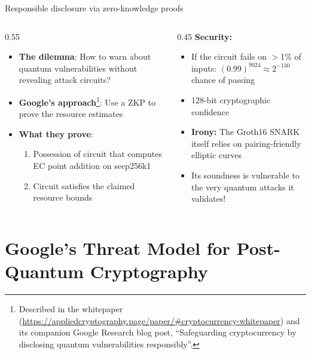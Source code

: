 \ifdefined\PRESENTATION\else\PassOptionsToClass{handout}{beamer}\fi\documentclass[aspectratio=169, lualatex]{beamer}
\begin{document}
\begin{frame}{Responsible disclosure via zero-knowledge proofs}
	\begin{columns}[c]
		\begin{column}{0.55\textwidth}
			\begin{itemize}
				\item \textbf{The dilemma}: How to warn about quantum vulnerabilities without revealing attack circuits?
				\item \textbf{Google's approach}\footnote{Described in the whitepaper (\url{https://appliedcryptography.page/paper/\#cryptocurrency-whitepaper}) and its companion Google Research blog post, ``Safeguarding cryptocurrency by disclosing quantum vulnerabilities responsibly''.}: Use a ZKP to prove the resource estimates
				\item \textbf{What they prove}:
				      \begin{enumerate}
					      \item Possession of circuit that computes EC point addition on secp256k1
					      \item Circuit satisfies the claimed resource bounds
				      \end{enumerate}
			\end{itemize}
		\end{column}
		\begin{column}{0.45\textwidth}
			\textbf{Security:}
			\begin{itemize}
				\item If the circuit fails on $>$1\% of inputs: $(0.99)^{9024} \approx 2^{-130}$ chance of passing
				\item 128-bit cryptographic confidence
			\end{itemize}
			\begin{itemize}
				\item \textbf{Irony:} The Groth16 SNARK itself relies on pairing-friendly elliptic curves
				\item Its soundness is vulnerable to the very quantum attacks it validates!
			\end{itemize}
		\end{column}
	\end{columns}
\end{frame}

\section{Google's Threat Model for Post-Quantum Cryptography}
\end{document}
